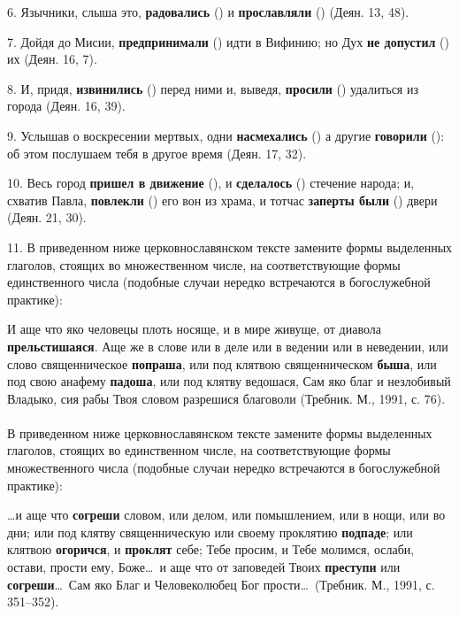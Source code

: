 \documentclass[11pt,a4paper,oneside]{memoir}
\newcommand{\exercise}{}
\begin{document}
    6. Язычники, слыша это, \textbf{радовались} ({}) и \textbf{прославляли} ({}) (Деян. 13, 48).
    
    7. Дойдя до Мисии, \textbf{предпринимали} ({}) идти в Вифинию; но Дух \textbf{не допустил} ({}) их (Деян. 16, 7).
    
    8. И, придя, \textbf{извинились} ({}) перед ними и, выведя, \textbf{просили} ({}) удалиться из города (Деян. 16, 39).
    
    9. Услышав о воскресении мертвых, одни \textbf{насмехались} ({}) а другие \textbf{говорили} ({}): об этом послушаем тебя в другое время (Деян. 17, 32).
    
    10. Весь город \textbf{пришел в движение} ({}), и \textbf{сделалось} ({}) стечение народа; и, схватив Павла, \textbf{повлекли} ({}) его вон из храма, и тотчас \textbf{заперты были} ({}) двери (Деян. 21, 30).
    
    11. В приведенном ниже церковнославянском тексте замените формы выделенных глаголов, стоящих во множественном числе, на соответствующие формы единственного числа (подобные случаи нередко встречаются в богослужебной практике):
    
    И аще что яко человецы плоть носяще, и в мире живуще, от диавола \textbf{прельстишаяся}. Аще же в слове или в деле или в ведении или в неведении, или слово священническое \textbf{попраша}, или под клятвою священническом \textbf{быша}, или под свою анафему \textbf{падоша}, или под клятву ведошася, Сам яко благ и незлобивый Владыко, сия рабы Твоя словом разрешися благоволи (Требник. М., 1991, с. 76).

                    \paragraph{\exercise}
                    
    В приведенном ниже церковнославянском тексте замените формы выделенных глаголов, стоящих во единственном числе, на соответствующие формы множественного числа (подобные случаи нередко встречаются в богослужебной практике):
    
    \ldots и аще что \textbf{согреши} словом, или делом, или помышлением, или в нощи, или во дни; или под клятву священническую или своему проклятию \textbf{подпаде}; или клятвою \textbf{огоричся}, и \textbf{проклят} себе; Тебе просим, и Тебе молимся, ослаби, остави, прости ему, Боже\ldots~и аще что от заповедей Твоих \textbf{преступи} или \textbf{согреши}\ldots~Сам яко Благ и Человеколюбец Бог прости\ldots~(Требник. М., 1991, с. 351--352).
\end{document}
